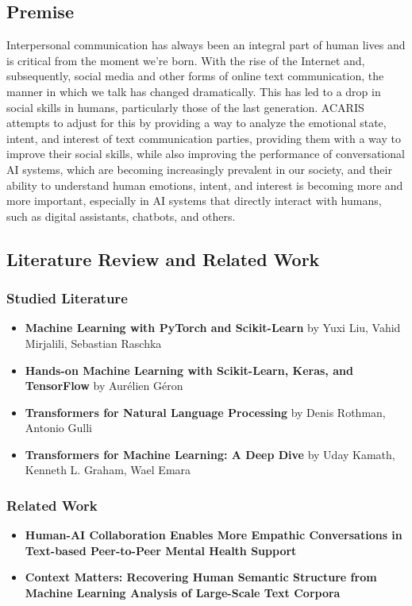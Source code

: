 \documentclass{article}
\begin{document}
\subsection{Premise}
Interpersonal communication has always been an integral part of human lives and is critical from the moment we're born. With the rise of the Internet and, subsequently, social media and other forms of online text communication, the manner in which we talk has changed dramatically. This has led to a drop in social skills in humans, particularly those of the last generation. ACARIS attempts to adjust for this by providing a way to analyze the emotional state, intent, and interest of text communication parties, providing them with a way to improve their social skills, while also improving the performance of conversational AI systems, which are becoming increasingly prevalent in our society, and their ability to understand human emotions, intent, and interest is becoming more and more important, especially in AI systems that directly interact with humans, such as digital assistants, chatbots, and others.

\subsection{Literature Review and Related Work}
\subsubsection{Studied Literature}
\begin{itemize}
	\item \textbf{Machine Learning with PyTorch and Scikit-Learn}\cite{raschka2022machine} by Yuxi Liu, Vahid Mirjalili, Sebastian Raschka
	\item \textbf{Hands-on Machine Learning with Scikit-Learn, Keras, and TensorFlow}\cite{geron2022hands} by Aurélien Géron
	\item \textbf{Transformers for Natural Language Processing}\cite{rothman2022transformers} by Denis Rothman, Antonio Gulli
	\item \textbf{Transformers for Machine Learning: A Deep Dive}\cite{kamath2022transformers} by Uday Kamath, Kenneth L. Graham, Wael Emara
\end{itemize}
\subsubsection{Related Work}
\begin{itemize}
	\item \textbf{Human-AI Collaboration Enables More Empathic Conversations in Text-based Peer-to-Peer Mental Health Support}\cite{sharma2022humanai}
	\item \textbf{Context Matters: Recovering Human Semantic Structure from Machine Learning Analysis of Large-Scale Text Corpora}\cite{https://doi.org/10.1111/cogs.13085}
\end{itemize}
\end{document}
